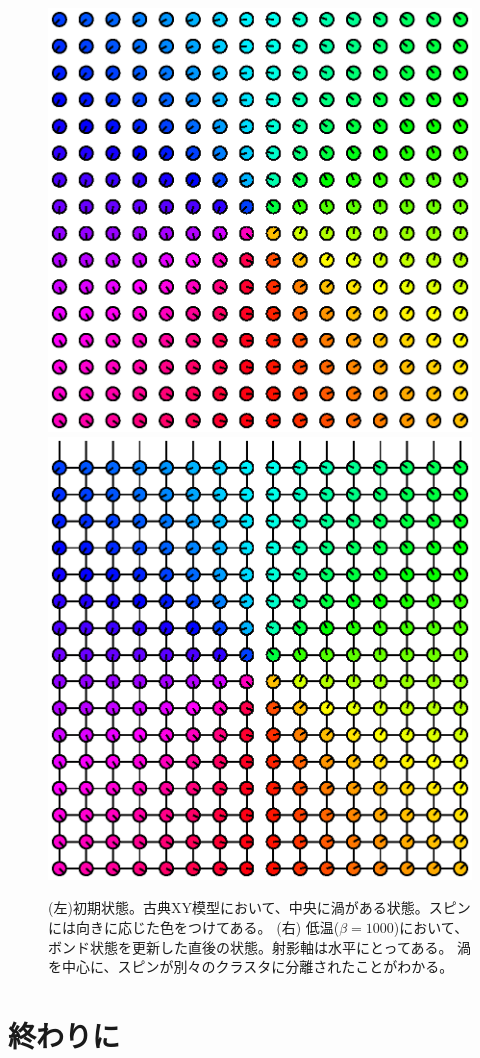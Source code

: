 \documentclass{jarticle}
\begin{document}
\begin{figure}
  \begin{center}
    \includegraphics[width=0.45\linewidth]{xy_init.eps}
    \includegraphics[width=0.45\linewidth]{xy_sw.eps}
  \end{center}
  \caption{(左)初期状態。古典XY模型において、中央に渦がある状態。スピンには向きに応じた色をつけてある。
    (右) 低温($\beta = 1000$)において、ボンド状態を更新した直後の状態。射影軸は水平にとってある。
    渦を中心に、スピンが別々のクラスタに分離されたことがわかる。
  }\label{fig_xy}
\end{figure}

\section{終わりに}
\end{document}
